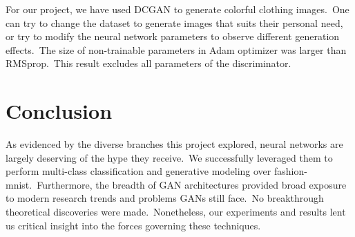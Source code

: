 \documentclass[conference]{IEEEtran}
\begin{document}
    For our project, we have used DCGAN to generate colorful clothing images.\ One can try to change the dataset to generate images that suits their personal need, or try to modify the neural network parameters to observe different generation effects.\ The size of non-trainable parameters in Adam optimizer was larger than RMSprop.\ This result excludes all parameters of the discriminator.\

    \section{Conclusion}\label{sec:conclusion}

    As evidenced by the diverse branches this project explored, neural networks are largely deserving of the hype they receive.\ We successfully leveraged them to perform multi-class classification and generative modeling over fashion-mnist.\ Furthermore, the breadth of GAN architectures provided broad exposure to modern research trends and problems GANs still face.\ No breakthrough theoretical discoveries were made.\ Nonetheless, our experiments and results lent us critical insight into the forces governing these techniques.

    
    
\end{document}
